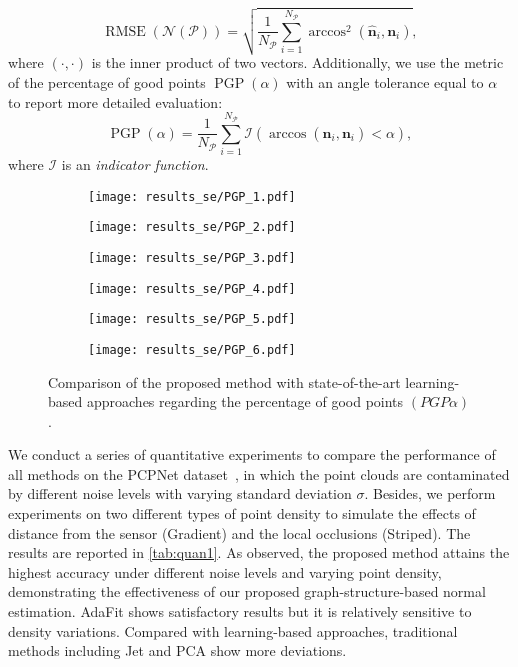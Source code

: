 \documentclass[runningheads]{llncs}
\begin{document}
\begin{equation}
\operatorname{RMSE}(\mathcal{N}(\mathcal{P}))=\sqrt{\frac{1}{N_{\mathcal{P}}} \sum_{i=1}^{N_{\mathcal{P}}} \arccos^2\left(\hat{\mathbf{n}}_i,\mathbf{n}_i\right)},
\end{equation}
where $(\cdot , \cdot)$ is the inner product of two vectors.
Additionally, we use the metric of the percentage of good points $\operatorname{PGP}(\alpha)$ with an angle tolerance equal to $\alpha$ to report more detailed evaluation:
\begin{equation}
\operatorname{PGP}(\alpha)=\frac{1}{N_{\mathcal{P}}} \sum_{{i}=1}^{N_{\mathcal{P}}} \mathcal{I}\left( \arccos\left(\hat{\mathbf{n}}_i,\mathbf{n}_i\right) < \alpha \right),
\end{equation} where $\mathcal{I}$ is an \textit{indicator function}.
\begin{figure}[t]
  \centering
  \begin{subfigure}{0.3\linewidth}
    \texttt{[image: results\_se/PGP\_1.pdf]}
  \end{subfigure}
  \begin{subfigure}{0.3\linewidth}
    \texttt{[image: results\_se/PGP\_2.pdf]}
  \end{subfigure}
  \begin{subfigure}{0.3\linewidth}
    \texttt{[image: results\_se/PGP\_3.pdf]}
  \end{subfigure}
  \begin{subfigure}{0.3\linewidth}
    \texttt{[image: results\_se/PGP\_4.pdf]}
  \end{subfigure}
  \begin{subfigure}{0.3\linewidth}
    \texttt{[image: results\_se/PGP\_5.pdf]}
  \end{subfigure}
  \begin{subfigure}{0.3\linewidth}
    \texttt{[image: results\_se/PGP\_6.pdf]}
  \end{subfigure}
  \caption{Comparison of the proposed method with state-of-the-art learning-based approaches regarding the percentage of good points $\left(PGP \alpha \right)$.
}
\label{fig:pgp}
\end{figure}


We conduct a series of quantitative experiments to compare the performance of all methods on the PCPNet dataset~\cite{guerrero2018pcpnet}, in which the point clouds are contaminated by different noise levels with varying standard deviation $\sigma$. Besides, we perform experiments on two different types of point density to simulate the effects of distance from the sensor (Gradient) and the local occlusions (Striped). The results are reported in \cref{tab:quan1}. As observed, the proposed method attains the highest accuracy under different noise levels and varying point density, demonstrating the effectiveness of our proposed graph-structure-based normal estimation. AdaFit shows satisfactory results but it is relatively sensitive to density variations. Compared with learning-based approaches, traditional methods including Jet and PCA show more deviations. 
\end{document}
